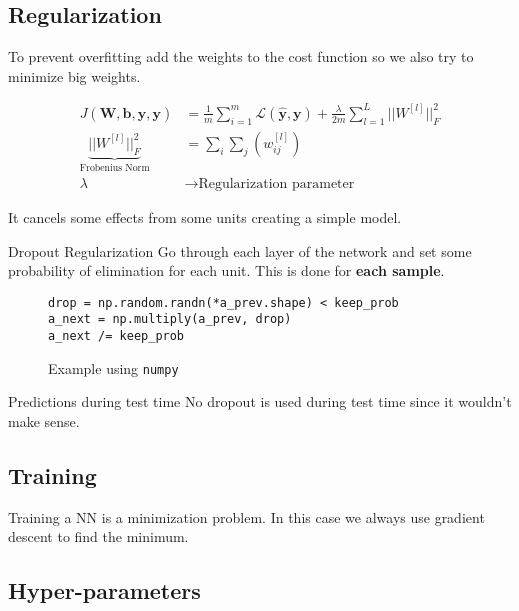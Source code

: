 \subsection{Regularization}
\begin{frame}{\insertsubsec}
    To prevent overfitting add the weights to the cost function so we also try to minimize
    big weights.

    \begin{align*}
        J(\bm{W}, \bm{b}, \hat{\bm{y}}, \bm{y}) &= 
        \frac{1}{m} \sum_{i = 1}^m \mathcal{L}(\hat{\bm{y}}, \bm{y}) + 
        \frac{\lambda}{2m} \sum_{l=1}^L ||W^{[l]}||^2_F \\ 
        \underbrace{||W^{[l]}||^2_F}_{\text{Frobenius Norm}} &= \sum_i \sum_j (w_{ij}^{[l]}) \\
        \lambda &\rightarrow \text{Regularization parameter}
    \end{align*}

    It cancels some effects from some units creating a simple model.
\end{frame}
\begin{frame}[fragile]{Dropout Regularization}
    Go through each layer of the network and set some probability of elimination for each unit. 
    This is done for \textbf{each sample}.

    \begin{figure}
        \begin{verbatim}
drop = np.random.randn(*a_prev.shape) < keep_prob
a_next = np.multiply(a_prev, drop)
a_next /= keep_prob
        \end{verbatim}
        \caption{Example using \texttt{numpy}}
    \end{figure}

    \begin{alertblock}{Predictions during test time}
        No dropout is used during test time since it wouldn't make sense.
    \end{alertblock}
\end{frame}

\subsection{Training}
\begin{frame}{\insertsubsec}
    Training a NN is a minimization problem. In this case we always use gradient descent
    to find the minimum.
\end{frame}

\subsection{Hyper-parameters}
\begin{frame}{\insertsubsec}
    
\end{frame}
